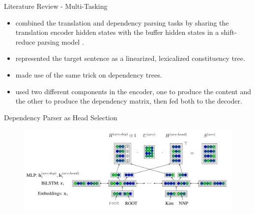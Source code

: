 \documentclass{beamer}
\begin{document}

\begin{frame}{Literature Review - Multi-Tasking}
\begin{itemize}
    \item \citet{DBLP:conf/acl/EriguchiTC17} combined the translation and dependency parsing tasks by sharing the translation encoder hidden states with the buffer hidden states in a shift-reduce parsing model \cite{DBLP:conf/naacl/DyerKBS16}.
    \item \citet{DBLP:conf/acl/AharoniG17a} represented the target sentence as a linearized, lexicalized constituency tree.
    \item \citet{DBLP:conf/ijcnlp/LeMYM17} made use of the same trick on dependency trees.
     \item \cite{tran2018inducing} used two different components in the encoder, one to produce the content and the other to produce the dependency matrix, then fed both to the decoder.
\end{itemize}
\end{frame}


\begin{frame}{Dependency Parser as Head Selection \citep{dozat:biaffine:2017}}
\begin{figure}[t]
    \includegraphics[width=\textwidth]{img/biaffine-parser.png}
\end{figure}
\end{frame}

\end{document}
